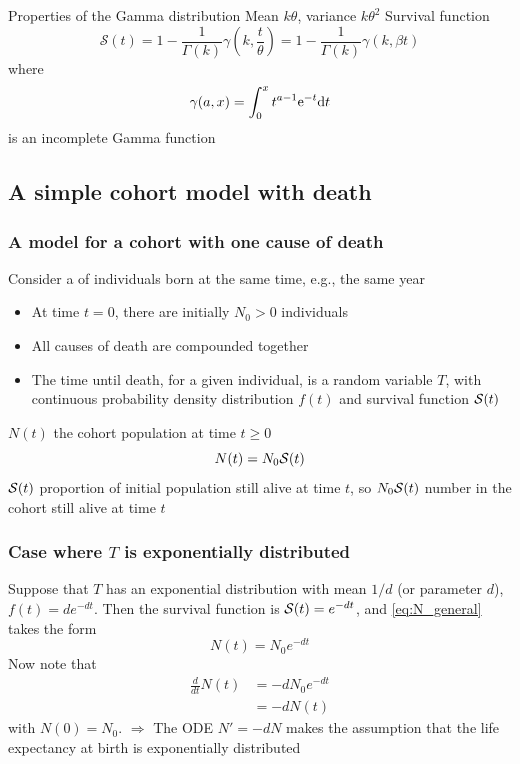 \documentclass[aspectratio=169]{beamer}
\begin{document}
\begin{frame}{Properties of the Gamma distribution}
Mean $k\theta$, variance $k\theta^2$
\vfill
Survival function
\[
\mathcal{S}(t)=
1-\frac{1}{\Gamma(k)}\gamma\left(
k,\frac{t}{\theta} 
\right)
=1-\frac{1}{\Gamma(k)}\gamma\left(
k,\beta t
\right)
\]
where 
\[
\gamma(a,x)=\int_0^x t^{a-1}{\rm e}^{-t}{\rm d}t
\]
is an incomplete Gamma function
\end{frame}





\subsection{A simple cohort model with death} 

\begin{frame}\frametitle{A model for a cohort with one cause of death}
Consider a  of individuals born at the same time, e.g., the same year
\vfill
\begin{itemize}
\item At time $t=0$, there are initially $N_0>0$ individuals
\item All causes of death are compounded together 
\item The time until death, for a given individual, is a random variable $T$, with continuous probability density distribution $f(t)$ and survival function $\S(t)$
\end{itemize}
\vfill
$N(t)$ the cohort population at time $t\geq 0$
\begin{equation}\label{eq:N_general}
N(t)=N_0\S(t)
\end{equation}
\vfill
$\S(t)$ proportion of initial population still alive at time $t$, so $N_0\S(t)$ number in the cohort still alive at time $t$
\end{frame}

\begin{frame}\frametitle{Case where $T$ is exponentially distributed}
Suppose that $T$ has an exponential distribution with mean $1/d$ (or parameter $d$), $f(t)=de^{-dt}$. Then the survival function is $\S(t)=e^{-dt}$, and \eqref{eq:N_general} takes the form
\begin{equation}\label{eq:N}
N(t)=N_0e^{-dt}
\end{equation}
\vfill
Now note that
\begin{align*}
\frac{d}{dt} N(t) &= -dN_0e^{-dt} \\
&= -dN(t)
\end{align*}
with $N(0)=N_0$.
\vfill
{\red $\Rightarrow$} The ODE $N'=-dN$ makes the assumption that the life expectancy at birth is exponentially distributed
\end{frame}
\end{document}
